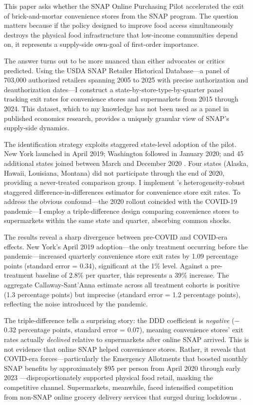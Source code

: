 \documentclass[12pt]{article}
\begin{document}
This paper asks whether the SNAP Online Purchasing Pilot accelerated the exit of brick-and-mortar convenience stores from the SNAP program. The question matters because if the policy designed to improve food access simultaneously destroys the physical food infrastructure that low-income communities depend on, it represents a supply-side own-goal of first-order importance.

The answer turns out to be more nuanced than either advocates or critics predicted. Using the USDA SNAP Retailer Historical Database---a panel of 703,000 authorized retailers spanning 2005 to 2025 with precise authorization and deauthorization dates---I construct a state-by-store-type-by-quarter panel tracking exit rates for convenience stores and supermarkets from 2015 through 2024. This dataset, which to my knowledge has not been used as a panel in published economics research, provides a uniquely granular view of SNAP's supply-side dynamics.

The identification strategy exploits staggered state-level adoption of the pilot. New York launched in April 2019; Washington followed in January 2020; and 45 additional states joined between March and December 2020 \citep{jones_2024}. Four states (Alaska, Hawaii, Louisiana, Montana) did not participate through the end of 2020, providing a never-treated comparison group. I implement \citet{callaway_2021}'s heterogeneity-robust staggered difference-in-differences estimator for convenience store exit rates. To address the obvious confound---the 2020 rollout coincided with the COVID-19 pandemic---I employ a triple-difference design comparing convenience stores to supermarkets within the same state and quarter, absorbing common shocks.

The results reveal a sharp divergence between pre-COVID and COVID-era effects. New York's April 2019 adoption---the only treatment occurring before the pandemic---increased quarterly convenience store exit rates by 1.09 percentage points (standard error = 0.34), significant at the 1\% level. Against a pre-treatment baseline of 2.8\% per quarter, this represents a 39\% increase. The aggregate Callaway-Sant'Anna estimate across all treatment cohorts is positive (1.3 percentage points) but imprecise (standard error = 1.2 percentage points), reflecting the noise introduced by the pandemic.

The triple-difference tells a surprising story: the DDD coefficient is \emph{negative} ($-$0.32 percentage points, standard error = 0.07), meaning convenience stores' exit rates actually \emph{declined} relative to supermarkets after online SNAP arrived. This is not evidence that online SNAP helped convenience stores. Rather, it reveals that COVID-era forces---particularly the Emergency Allotments that boosted monthly SNAP benefits by approximately \$95 per person from April 2020 through early 2023 \citep{rosenbaum_2023}---disproportionately supported physical food retail, masking the competitive channel. Supermarkets, meanwhile, faced intensified competition from non-SNAP online grocery delivery services that surged during lockdowns \citep{charm_2020}.
\end{document}
